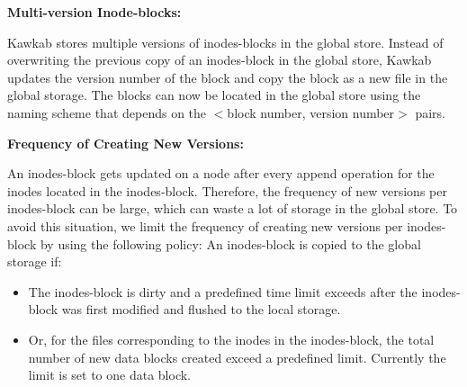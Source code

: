 \documentclass[]{article}
\newcommand{\subtopic}[1]{\vspace{1.5pt} \noindent \textbf{#1}}
\begin{document}


\subtopic{Multi-version Inode-blocks:} 


Kawkab stores multiple versions of inodes-blocks in the global store.  Instead
of overwriting the previous copy of an inodes-block in the global store, Kawkab
updates the version number of the block and copy the block as a new file in the
global storage. The blocks can now be located in the global store using the naming
scheme that depends on the $<$block number,  version number$>$ pairs.


\subtopic{Frequency of Creating New Versions:}

An inodes-block gets  updated on a node after every append operation for the
inodes located in the inodes-block. Therefore, the frequency of new versions
per inodes-block can be large, which can waste a lot of storage in the global
store.  To avoid this situation, we limit the frequency of creating new
versions per inodes-block by using the following policy: An inodes-block is
copied to the global storage if:

\begin{itemize}

\item The inodes-block is dirty and a predefined time limit exceeds after the
      inodes-block was first modified and flushed to the local storage.

\item Or, for the files corresponding to the inodes in the inodes-block, 
      the total number of new data blocks created exceed a predefined limit.
      Currently the limit is set to one data block.

\end{itemize}
\end{document}
